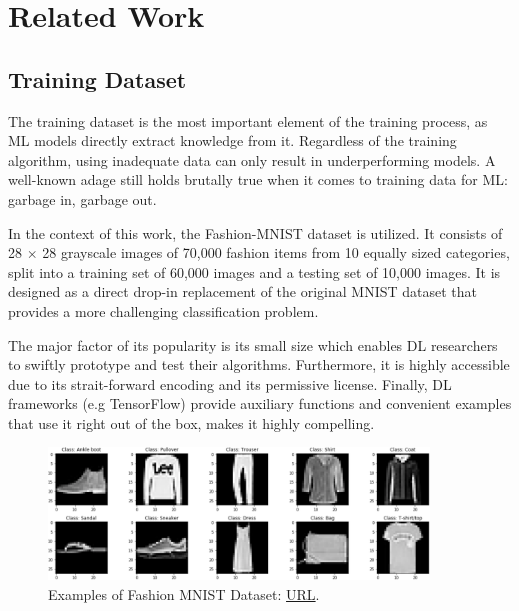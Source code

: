 \chapter{Related Work}
\label{Chapter-Related-Work}
\section{Training Dataset}
The training dataset is the most important element of the training process, as ML models directly extract knowledge from it. Regardless of the training algorithm, using inadequate data can only result in underperforming models. A well-known adage still holds brutally true when it comes to training data for ML: garbage in, garbage out.

In the context of this work, the Fashion-MNIST \cite{fashion_mnist} dataset is utilized. It consists of 28 \(\times\) 28 grayscale images of 70,000 fashion items from 10 equally sized categories, split into a training set of 60,000 images and a testing set of 10,000 images. It is designed as a direct drop-in replacement of the original MNIST dataset \cite{digits_mnist} that provides a more challenging classification problem.

The major factor of its popularity is its small size which enables DL researchers to swiftly prototype and test their algorithms. Furthermore, it is highly accessible due to its strait-forward encoding and its permissive license. Finally, DL frameworks (e.g TensorFlow) provide auxiliary functions and convenient examples that use it right out of the box, makes it highly compelling.

\begin{figure}[H]
    \centering
        \includegraphics[width=0.9\textwidth]{Images/Examples_Fashion_MNIST.png}
        \decoRule
        \caption[Examples of Fashion MNIST Dataset]{Examples of Fashion MNIST Dataset: \href{https://www.bouvet.no/bouvet-deler/understanding-convolutional-neural-networks-part-2}{URL}.}
        \label{fig:Fashion_MNIST_dataset}
\end{figure}


